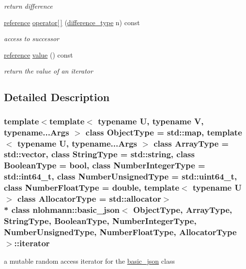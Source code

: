 \begin{DoxyCompactItemize}
\begin{DoxyCompactList}\small\item\em return difference \end{DoxyCompactList}\item 
\hyperlink{classnlohmann_1_1basic__json_1_1const__iterator_aefd248cac6493eed1e6ff53ba6a63eb2}{reference} \hyperlink{classnlohmann_1_1basic__json_1_1iterator_a7e01532727c10f87926dac4eb8e170f4}{operator\mbox{[}$\,$\mbox{]}} (\hyperlink{classnlohmann_1_1basic__json_1_1const__iterator_a49d7c3e9ef3280df03052cce988b792f}{difference\+\_\+type} n) const 
\begin{DoxyCompactList}\small\item\em access to successor \end{DoxyCompactList}\item 
\hyperlink{classnlohmann_1_1basic__json_1_1const__iterator_aefd248cac6493eed1e6ff53ba6a63eb2}{reference} \hyperlink{classnlohmann_1_1basic__json_1_1iterator_a8ffbf287736048e683f58306fdb8701f}{value} () const 
\begin{DoxyCompactList}\small\item\em return the value of an iterator \end{DoxyCompactList}\end{DoxyCompactItemize}


\subsection{Detailed Description}
\subsubsection*{template$<$template$<$ typename U, typename V, typename...\+Args $>$ class Object\+Type = std\+::map, template$<$ typename U, typename...\+Args $>$ class Array\+Type = std\+::vector, class String\+Type = std\+::string, class Boolean\+Type = bool, class Number\+Integer\+Type = std\+::int64\+\_\+t, class Number\+Unsigned\+Type = std\+::uint64\+\_\+t, class Number\+Float\+Type = double, template$<$ typename U $>$ class Allocator\+Type = std\+::allocator$>$\\*
class nlohmann\+::basic\+\_\+json$<$ Object\+Type, Array\+Type, String\+Type, Boolean\+Type, Number\+Integer\+Type, Number\+Unsigned\+Type, Number\+Float\+Type, Allocator\+Type $>$\+::iterator}

a mutable random access iterator for the \hyperlink{classnlohmann_1_1basic__json}{basic\+\_\+json} class 

